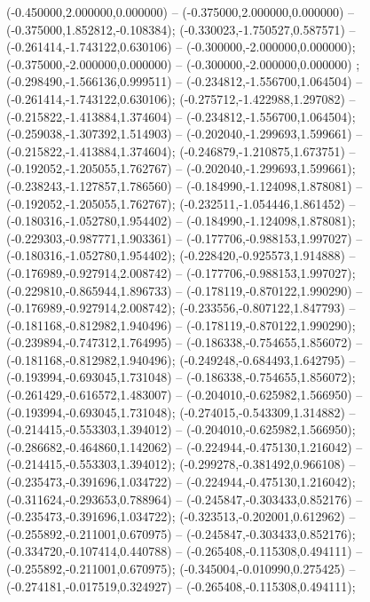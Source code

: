  (-0.450000,2.000000,0.000000) -- (-0.375000,2.000000,0.000000) -- (-0.375000,1.852812,-0.108384);
 (-0.330023,-1.750527,0.587571) -- (-0.261414,-1.743122,0.630106) -- (-0.300000,-2.000000,0.000000);
 (-0.375000,-2.000000,0.000000) -- (-0.300000,-2.000000,0.000000) ;
 (-0.298490,-1.566136,0.999511) -- (-0.234812,-1.556700,1.064504) -- (-0.261414,-1.743122,0.630106);
 (-0.275712,-1.422988,1.297082) -- (-0.215822,-1.413884,1.374604) -- (-0.234812,-1.556700,1.064504);
 (-0.259038,-1.307392,1.514903) -- (-0.202040,-1.299693,1.599661) -- (-0.215822,-1.413884,1.374604);
 (-0.246879,-1.210875,1.673751) -- (-0.192052,-1.205055,1.762767) -- (-0.202040,-1.299693,1.599661);
 (-0.238243,-1.127857,1.786560) -- (-0.184990,-1.124098,1.878081) -- (-0.192052,-1.205055,1.762767);
 (-0.232511,-1.054446,1.861452) -- (-0.180316,-1.052780,1.954402) -- (-0.184990,-1.124098,1.878081);
 (-0.229303,-0.987771,1.903361) -- (-0.177706,-0.988153,1.997027) -- (-0.180316,-1.052780,1.954402);
 (-0.228420,-0.925573,1.914888) -- (-0.176989,-0.927914,2.008742) -- (-0.177706,-0.988153,1.997027);
 (-0.229810,-0.865944,1.896733) -- (-0.178119,-0.870122,1.990290) -- (-0.176989,-0.927914,2.008742);
 (-0.233556,-0.807122,1.847793) -- (-0.181168,-0.812982,1.940496) -- (-0.178119,-0.870122,1.990290);
 (-0.239894,-0.747312,1.764995) -- (-0.186338,-0.754655,1.856072) -- (-0.181168,-0.812982,1.940496);
 (-0.249248,-0.684493,1.642795) -- (-0.193994,-0.693045,1.731048) -- (-0.186338,-0.754655,1.856072);
 (-0.261429,-0.616572,1.483007) -- (-0.204010,-0.625982,1.566950) -- (-0.193994,-0.693045,1.731048);
 (-0.274015,-0.543309,1.314882) -- (-0.214415,-0.553303,1.394012) -- (-0.204010,-0.625982,1.566950);
 (-0.286682,-0.464860,1.142062) -- (-0.224944,-0.475130,1.216042) -- (-0.214415,-0.553303,1.394012);
 (-0.299278,-0.381492,0.966108) -- (-0.235473,-0.391696,1.034722) -- (-0.224944,-0.475130,1.216042);
 (-0.311624,-0.293653,0.788964) -- (-0.245847,-0.303433,0.852176) -- (-0.235473,-0.391696,1.034722);
 (-0.323513,-0.202001,0.612962) -- (-0.255892,-0.211001,0.670975) -- (-0.245847,-0.303433,0.852176);
 (-0.334720,-0.107414,0.440788) -- (-0.265408,-0.115308,0.494111) -- (-0.255892,-0.211001,0.670975);
 (-0.345004,-0.010990,0.275425) -- (-0.274181,-0.017519,0.324927) -- (-0.265408,-0.115308,0.494111);
